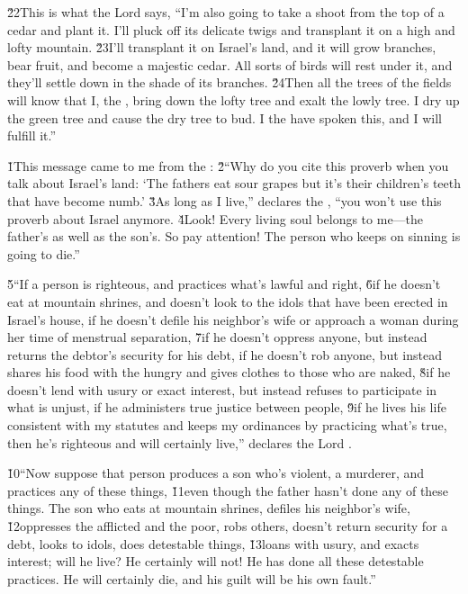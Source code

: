 \v{22}This is what the Lord  says, ``I'm also going to take a shoot from the top of a cedar and plant it. I'll pluck off its delicate twigs and transplant it on a high and lofty mountain. \v{23}I'll transplant it on Israel's land, and it will grow branches, bear fruit, and become a majestic cedar. All sorts of birds will rest under it, and they'll settle down in the shade of its branches. \v{24}Then all the trees of the fields will know that I, the , bring down the lofty tree and exalt the lowly tree. I dry up the green tree and cause the dry tree to bud. I the  have spoken this, and I will fulfill it.''

\v{1}This message came to me from the : \v{2}``Why do you cite this proverb when you talk about Israel's land: `The fathers eat sour grapes but it's their children's teeth that have become numb.' \v{3}As long as I live,'' declares the , ``you won't use this proverb about Israel anymore. \v{4}Look! Every living soul belongs to me---the father's as well as the son's. So pay attention! The person who keeps on sinning is going to die.''

\v{5}``If a person is righteous, and practices what's lawful and right, \v{6}if he doesn't eat at mountain shrines, and doesn't look to the idols that have been erected in Israel's house, if he doesn't defile his neighbor's wife or approach a woman during her time of menstrual separation, \v{7}if he doesn't oppress anyone, but instead returns the debtor's security for his debt, if he doesn't rob anyone, but instead shares his food with the hungry and gives clothes to those who are naked, \v{8}if he doesn't lend with usury or exact interest, but instead refuses to participate in what is unjust, if he administers true justice between people, \v{9}if he lives his life consistent with my statutes and keeps my ordinances by practicing what's true, then he's righteous and will certainly live,'' declares the Lord .

\v{10}``Now suppose that person produces a son who's violent, a murderer, and practices any of these things, \v{11}even though the father hasn't done any of these things. The son who eats at mountain shrines, defiles his neighbor's wife, \v{12}oppresses the afflicted and the poor, robs others, doesn't return security for a debt, looks to idols, does detestable things, \v{13}loans with usury, and exacts interest; will he live? He certainly will not! He has done all these detestable practices. He will certainly die, and his guilt will be his own fault.''

